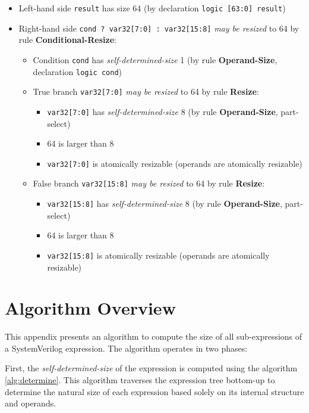 \documentclass{article}
\newcommand{\sv}[1]{\texttt{#1}}
\newcommand{\sds}{\emph{self-determined-size}}
\newcommand{\mbr}{\emph{may be resized}}
\begin{document}
\begin{itemize}
  \item Left-hand side \sv{result} has size 64 (by declaration
    \sv{logic [63:0] result})
  \item Right-hand side \sv{cond ? var32[7:0] : var32[15:8]}
    \mbr{} to 64 by rule \textbf{Conditional-Resize}:
    \begin{itemize}
      \item Condition \sv{cond} has \sds{} 1 (by rule
        \textbf{Operand-Size}, declaration \sv{logic cond})
      \item True branch \sv{var32[7:0]} \mbr{} to 64 by rule
        \textbf{Resize}:
        \begin{itemize}
          \item \sv{var32[7:0]} has \sds{} 8 (by rule
            \textbf{Operand-Size}, part-select)
          \item 64 is larger than 8
          \item \sv{var32[7:0]} is atomically resizable (operands are
            atomically resizable)
        \end{itemize}
      \item False branch \sv{var32[15:8]} \mbr{} to 64 by
        rule \textbf{Resize}:
        \begin{itemize}
          \item \sv{var32[15:8]} has \sds{} 8 (by rule
            \textbf{Operand-Size}, part-select)
          \item 64 is larger than 8
          \item \sv{var32[15:8]} is atomically resizable (operands are
            atomically resizable)
        \end{itemize}
    \end{itemize}
\end{itemize}

\appendix
\section{Algorithm Overview}

This appendix presents an algorithm to compute the size of all sub-expressions
of a SystemVerilog expression. The algorithm operates in two phases:

First, the \sds{} of the expression is computed using the algorithm
\ref{alg:determine}. This algorithm traverses the expression
tree bottom-up to determine the natural size of each expression based solely on
its internal structure and operands.
\end{document}
